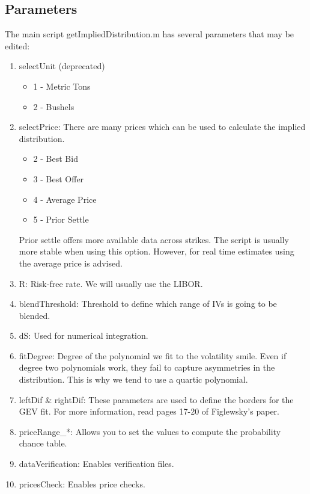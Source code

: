 \documentclass[10pt,a4paper]{book}
\begin{document}
\subsection{Parameters}
The main script getImpliedDistribution.m has several parameters that may be edited:
\begin{enumerate}
  \item selectUnit (deprecated)
    \begin{itemize}
    \item 1 - Metric Tons
    \item 2 - Bushels
    \end{itemize}
  \item selectPrice: There are many prices which can be used to calculate the implied distribution.
    \begin{itemize}
    \item 2 - Best Bid
    \item 3 - Best Offer
    \item 4 - Average Price
    \item 5 - Prior Settle
    \end{itemize}
Prior settle offers more available data across strikes. The script is usually more stable when using this option. However, for real time estimates using the average price is advised.
  \item R: Risk-free rate. We will usually use the LIBOR.
  \item blendThreshold: Threshold to define which range of IVs is going to be blended.
  \item dS: Used for numerical integration.
  \item fitDegree: Degree of the polynomial we fit to the volatility smile. Even if degree two polynomials work, they fail to capture asymmetries in the distribution. This is why we tend to use a quartic polynomial.
  \item leftDif \& rightDif: These parameters are used to define the borders for the GEV fit. For more information, read pages 17-20 of Figlewsky's paper.
  \item priceRange\_*: Allows you to set the values to compute the probability chance table.
  \item dataVerification: Enables verification files.
  \item pricesCheck: Enables price checks.
\end{enumerate}
\end{document}
